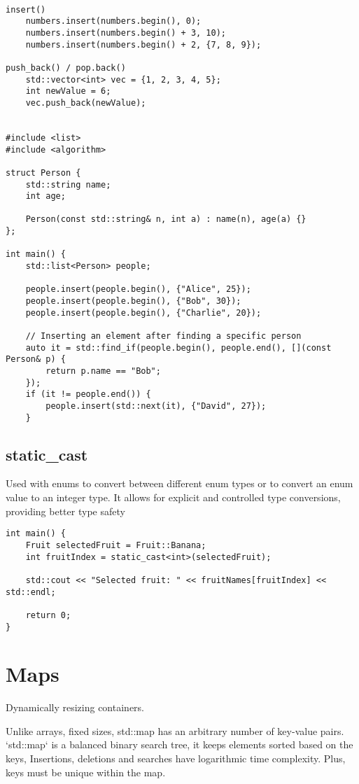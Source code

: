 \begin{verbatim}

insert()
    numbers.insert(numbers.begin(), 0); 
    numbers.insert(numbers.begin() + 3, 10);
    numbers.insert(numbers.begin() + 2, {7, 8, 9});

push_back() / pop.back()
    std::vector<int> vec = {1, 2, 3, 4, 5};
    int newValue = 6;
    vec.push_back(newValue);


#include <list>
#include <algorithm>

struct Person {
    std::string name;
    int age;

    Person(const std::string& n, int a) : name(n), age(a) {}
};

int main() {
    std::list<Person> people;

    people.insert(people.begin(), {"Alice", 25});
    people.insert(people.begin(), {"Bob", 30});
    people.insert(people.begin(), {"Charlie", 20});

    // Inserting an element after finding a specific person
    auto it = std::find_if(people.begin(), people.end(), [](const Person& p) {
        return p.name == "Bob";
    });
    if (it != people.end()) {
        people.insert(std::next(it), {"David", 27});
    }
\end{verbatim}

\subsection{static\_cast}

Used with enums to convert between different enum types or to convert an enum value to an integer type.
It allows for explicit and controlled type conversions, providing better type safety

\begin{verbatim}
int main() {
    Fruit selectedFruit = Fruit::Banana;
    int fruitIndex = static_cast<int>(selectedFruit);

    std::cout << "Selected fruit: " << fruitNames[fruitIndex] << std::endl;

    return 0;
}
\end{verbatim}


\section{Maps}

Dynamically resizing containers.

Unlike arrays, fixed sizes, std::map has an arbitrary number of key-value pairs.
`std::map` is a balanced binary search tree, it keeps elements sorted based on the keys, 
Insertions, deletions and searches have logarithmic time complexity.
Plus, keys must be unique within the map.

